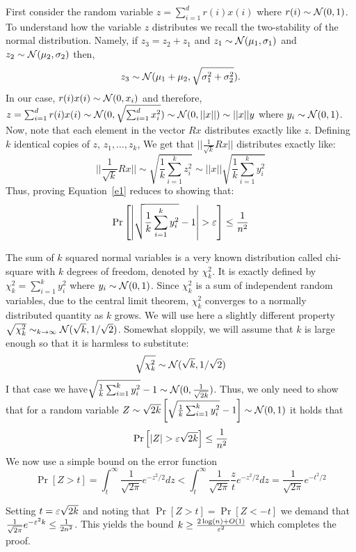 \documentclass{article}
\begin{document}
First consider the random variable $z = \sum_{i=1}^{d}r(i)x(i)$ where $r(i) \sim {\mathcal{N}}(0,1)$. 
To understand how the variable $z$ distributes we recall the two-stability of the
normal distribution. Namely, if $z_3 = z_2 + z_1$ and 
$z_1 \sim {\mathcal{N}}(\mu_1,\sigma_{1})$ and $z_2 \sim {\mathcal{N}}(\mu_2,\sigma_{2})$ then, $$z_3 \sim {\mathcal{N}}(\mu_1 + \mu_2,\sqrt{\sigma^{2}_{1} + \sigma^{2}_{2}}).$$
In our case,  $r(i)x(i) \sim {\mathcal{N}}(0,x_{i})$ and therefore, $z = \sum_{i=1}^{d}r(i)x(i) \sim {\mathcal{N}}(0,\sqrt{\sum_{i=1}^{d}x^{2}_{i}}) \sim {\mathcal{N}}(0,||x||) \sim  ||x||y$ 
where $y_i \sim {\mathcal{N}}(0,1)$.
%
Now, note that each element in the vector $Rx$ distributes exactly like $z$.
Defining $k$ identical copies of $z$, $z_1,\ldots,z_k$,
We get that $||\frac{1}{\sqrt{k}}Rx||$ distributes exactly like:
\[
||\frac{1}{\sqrt{k}}Rx|| \sim \sqrt{\frac{1}{k}\sum_{i=1}^{k} z^{2}_{i}} \sim ||x||\sqrt{\frac{1}{k}\sum_{i=1}^{k} y^{2}_{i}}
\]
%
Thus, proving Equation~\ref{e1} reduces to showing that:
\begin{equation}
\Pr\left[ \left| \sqrt{\frac{1}{k}\sum_{i=1}^{k} y^{2}_{i}} - 1 \right| > \varepsilon \right] \le \frac{1}{n^2} 
\end{equation}

The sum of $k$ squared normal variables is a very known distribution called chi-square with $k$ degrees of freedom, denoted by $\chi^2_k$.
It is exactly defined by $\chi^2_k = \sum_{i=1}^{k} y^{2}_{i}$ where $y_i \sim {\mathcal{N}}(0,1)$.
Since $\chi^2_k$ is a sum of independent random variables, due to the central limit theorem, $\chi^2_k$ converges to a normally distributed quantity as $k$ grows. We will use here a slightly different property $\sqrt{\chi^2_k} \sim_{k \rightarrow \infty} {\mathcal{N}}(\sqrt{k},1/\sqrt{2})$. 
Somewhat sloppily, we will assume that $k$ is large enough so that it is harmless to substitute:
$$\sqrt{\chi^2_k} \sim {\mathcal{N}}(\sqrt{k},1/\sqrt{2})$$
%
I that case we have$ \sqrt{\frac{1}{k}\sum_{i=1}^{k} y^{2}_{i}} -1\sim {\mathcal{N}}(0,\frac{1}{\sqrt{2k}})$.
Thus, we only need to show that for a random variable $Z \sim \sqrt{2k}\left[\sqrt{\frac{1}{k}\sum_{i=1}^{k} y^{2}_{i}} -1\right]  \sim {\mathcal{N}}(0,1)$ it holds that  
\begin{equation}
\Pr\left[ | Z | > \varepsilon \sqrt{2k}\right] \le \frac{1}{n^2} 
\end{equation}
We now use a simple bound on the error function
$$\Pr[ Z  > t] =  \int_{t}^{\infty} \frac{1}{\sqrt{2\pi}}e^{-z^2/2}dz < \int_{t}^{\infty} \frac{1}{\sqrt{2\pi}}\frac{z}{t} e^{-z^2/2}dz  = \frac{1}{\sqrt{2\pi}}e^{-t^{2}/2}$$

Setting $t=\varepsilon \sqrt{2k}$ and noting that $\Pr[Z  > t] = \Pr[Z  < -t] $ we demand that $\frac{1}{\sqrt{2\pi}}e^{-\varepsilon^2k} \le \frac{1}{2n^2}$. 
This yields the bound $k \ge \frac{2\log(n)+O(1)}{\varepsilon^2}$ which completes the proof.
\end{document}
